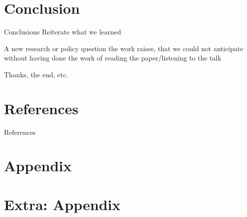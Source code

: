 \documentclass[aspectratio=169, 11pt]{beamer}
\begin{document}
\section{Conclusion}

\begin{frame}{Conclusions}
    Reiterate what we learned
    
    A new research or policy question the work raises, that we could not anticipate without having done the work of reading the paper/listening to the talk
\end{frame}

\begin{frame}
    \begin{center}
        \LARGE Thanks, the end, etc.
    \end{center}
\end{frame}

\AtBeginSection[]{}

\appendix

\section{References}

\begin{frame}[allowframebreaks]{References}
\begin{scriptsize}
    \printbibliography
\end{scriptsize}
\end{frame}

\section{Appendix}


\section{Extra: Appendix}
\end{document}
